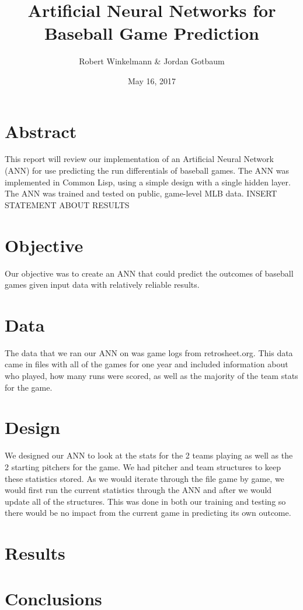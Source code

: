 \documentclass[]{article}   %
\begin{document}
\title{Artificial Neural Networks for Baseball Game Prediction}   %
\author{Robert Winkelmann \& Jordan Gotbaum}         %
\date{May 16, 2017}    %
\maketitle

\section{Abstract}
  This report will review our implementation of an Artificial Neural Network (ANN) for use predicting the run differentials of baseball games. The ANN was implemented in Common Lisp, using a simple design with a single hidden layer. The ANN was trained and tested on public, game-level MLB data. INSERT STATEMENT ABOUT RESULTS

\section{Objective}     %
Our objective was to create an ANN that could predict the outcomes of baseball games given input data with relatively reliable results. 

\section{Data}     %
The data that we ran our ANN on was game logs from retrosheet.org.  This data came in files with all of the games for one year and included information about who played, how many runs were scored, as well as the majority of the team stats for the game.

\section{Design}
We designed our ANN to look at the stats for the 2 teams playing as well as the 2 starting pitchers for the game.  We had pitcher and team structures to keep these statistics stored.  As we would iterate through the file game by game, we would first run the current statistics through the ANN and after we would update all of the structures.  This was done in both our training and testing so there would be no impact from the current game in predicting its own outcome.

\section{Results}  

\section{Conclusions}       %
\end{document}
